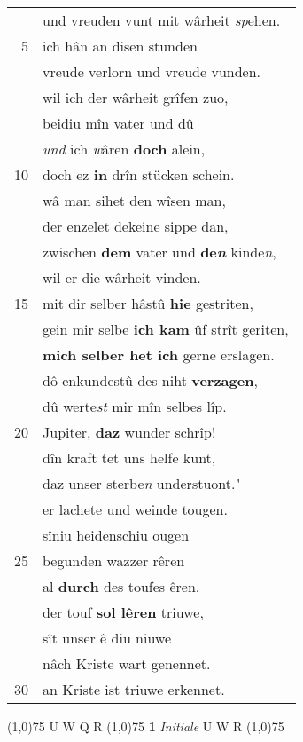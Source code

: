 \documentclass[8pt,a4paper,notitlepage]{article}
\begin{document}
\begin{table}[ht]
\begin{minipage}[t]{0.5\linewidth}
\begin{tabular}{rl}
 & und vreuden vunt mit wârheit \textit{sp}ehen.\\ 
5 & ich hân an disen stunden\\ 
 & vreude verlorn und vreude vunden.\\ 
 & wil ich der wârheit grîfen zuo,\\ 
 & beidiu mîn vater und dû\\ 
 & \textit{und} ich \textit{w}âren \textbf{doch} alein,\\ 
10 & doch ez \textbf{in} drîn stücken schein.\\ 
 & wâ man sihet den wîsen man,\\ 
 & der enzelet dekeine sippe dan,\\ 
 & zwischen \textbf{dem} vater und \textbf{de\textit{n}} kinde\textit{n},\\ 
 & wil er die wârheit vinden.\\ 
15 & mit dir selber hâstû \textbf{hie} gestriten,\\ 
 & gein mir selbe \textbf{ich kam} ûf strît geriten,\\ 
 & \textbf{mich selber het ich} gerne erslagen.\\ 
 & dô enkundestû des niht \textbf{verzagen},\\ 
 & dû werte\textit{st} mir mîn selbes lîp.\\ 
20 & Jupiter, \textbf{daz} wunder schrîp!\\ 
 & dîn kraft tet uns helfe kunt,\\ 
 & daz unser sterbe\textit{n} understuont."\\ 
 & er lachete und weinde tougen.\\ 
 & sîniu heidenschiu ougen\\ 
25 & begunden wazzer rêren\\ 
 & al \textbf{durch} des toufes êren.\\ 
 & der touf \textbf{sol lêren} triuwe,\\ 
 & sît unser ê diu niuwe\\ 
 & nâch Kriste wart genennet.\\ 
30 & an Kriste ist triuwe erkennet.\\ 
\end{tabular}
\scriptsize
\line(1,0){75} \newline
U W Q R \newline
\line(1,0){75} \newline
\textbf{1} \textit{Initiale} U W R  \newline
\line(1,0){75} \newline

\end{minipage}
\end{table}
\end{document}
